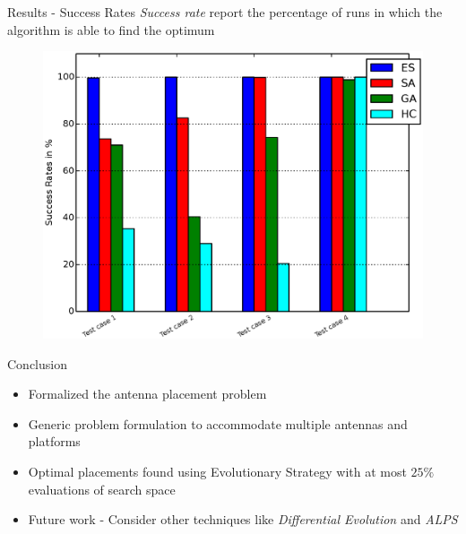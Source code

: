 \documentclass{beamer}
\begin{document}
\begin{frame}{Results - Success Rates}
    \textit{Success rate} report the percentage of runs in which the algorithm is able to find the optimum
    \begin{figure}
        \vspace*{-0.35cm}
        \centering
        \includegraphics[scale=0.4]{../paper/FIG/tc_sp}
    \end{figure}
\end{frame}

\begin{frame}{Conclusion}
    \begin{itemize} \itemsep1.5em
        \item Formalized the antenna placement problem
        \item Generic problem formulation to accommodate multiple antennas and platforms
        \item Optimal placements found using Evolutionary Strategy with at most $25\%$ evaluations of search space
        \item Future work - Consider other techniques like \textit{Differential Evolution} and \textit{ALPS}
    \end{itemize}
\end{frame}
\end{document}

